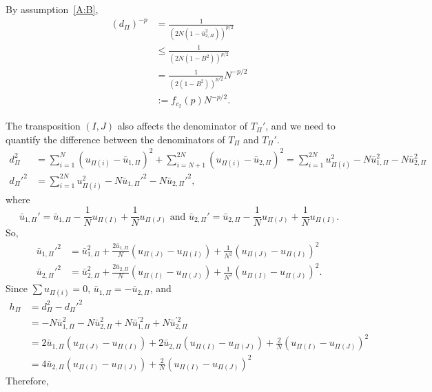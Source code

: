 By assumption~\eqref{A:B},
\begin{align}
  (d_{\Pi})^{-p} &= \frac{1}{(2N(1-\bar{u}_{2,\Pi}^2))^{p/2}} \nonumber \\
  &\leq \frac{1}{(2N(1-B^2))^{p/2}} \nonumber \\
  &= \frac{1}{(2(1-B^2))^{p/2}}N^{-p/2} \nonumber \\
  &:= f_{c_2}(p) N^{-p/2} \label{def:dp}.
\end{align}

The transposition $(I, J)$ also affects the denominator of $T_{\Pi}'$, and we need to quantify the
difference between the denominators of $T_{\Pi}$ and $T_{\Pi}'$.
\begin{align*}
    d_{\Pi}^2 &= \sum_{i=1}^N (u_{\Pi(i)} - \bar{u}_{1,\Pi})^2 + \sum_{i=N+1}^{2N} (u_{\Pi(i)} -
    \bar{u}_{2,\Pi})^2 = \sum_{i=1}^{2N} u_{\Pi(i)}^2 - N \bar{u}_{1,\Pi}^2 - N \bar{u}_{2,\Pi}^2 \\
    d_{\Pi}'^2 &= \sum_{i=1}^{2N} u_{\Pi(i)}^2 - N \bar{u}_{1,\Pi}'^2 - N \bar{u}_{2,\Pi}'^2,  
\end{align*}
where
\begin{equation*}
  \label{eq:6}
  \bar{u}_{1,\Pi}' = \bar{u}_{1,\Pi} - \frac{1}{N}u_{\Pi(I)} + \frac{1}{N}u_{\Pi(J)} \text{ and }
  \bar{u}_{2,\Pi}' = \bar{u}_{2,\Pi} - \frac{1}{N}u_{\Pi(J)} + \frac{1}{N}u_{\Pi(I)}.
\end{equation*}
So, 
\begin{align*}
  \bar{u}_{1,\Pi}'^2 &= \bar{u}_{1,\Pi}^2 + \frac{2\bar{u}_{1,\Pi}}{N}(u_{\Pi(J)}-u_{\Pi(I)}) +
  \frac{1}{N^2}(u_{\Pi(J)}-u_{\Pi(I)})^2 \\
  \bar{u}_{2,\Pi}'^2 &= \bar{u}_{2,\Pi}^2 + \frac{2\bar{u}_{2,\Pi}}{N}(u_{\Pi(I)}-u_{\Pi(J)}) +
  \frac{1}{N^2}(u_{\Pi(I)}-u_{\Pi(J)})^2.
\end{align*}
Since $\sum u_{\Pi(i)} = 0$, $\bar{u}_{1,\Pi} = -\bar{u}_{2,\Pi}$, and
\begin{align*}
  h_{\Pi} &= d_{\Pi}^2-d_{\Pi}'^2 \\
  &= -N \bar{u}_{1,\Pi}^2 -N \bar{u}_{2,\Pi}^2 + N\bar{u}_{1,\Pi}^{'2} + N\bar{u}_{2,\Pi}^{'2} \\
  &= 2\bar{u}_{1,\Pi}(u_{\Pi(J)}-u_{\Pi(I)}) + 2\bar{u}_{2,\Pi}(u_{\Pi(I)}-u_{\Pi(J)})+\frac{2}{N}(u_{\Pi(I)}-u_{\Pi(J)})^2 \\
  &= 4\bar{u}_{2,\Pi}(u_{\Pi(I)}-u_{\Pi(J)}) + \frac{2}{N}(u_{\Pi(I)}-u_{\Pi(J)})^2
\end{align*}
Therefore,
